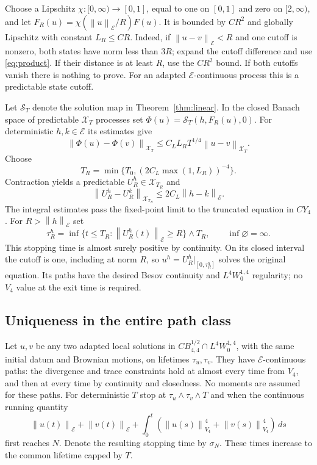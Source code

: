 \documentclass[11pt]{article}
\numberwithin{equation}{section}
\theoremstyle{remark}
\newcommand{\calE}{\mathcal E}
\newcommand{\calX}{\mathcal X}
\newcommand{\norm}[1]{\left\lVert#1\right\rVert}
\begin{document}
Choose a Lipschitz $\chi:[0,\infty)\to[0,1]$, equal to one on
$[0,1]$ and zero on $[2,\infty)$, and let
$F_R(u)=\chi(\norm{u}_{\calE}/R)F(u)$. It is bounded by $CR^2$
and globally Lipschitz with constant $L_R\leq CR$. Indeed, if
$\norm{u-v}_{\calE}<R$ and one cutoff is nonzero, both states have
norm less than $3R$; expand the cutoff difference and use
\eqref{eq:product}. If their distance is at least $R$, use the
$CR^2$ bound. If both cutoffs vanish there is nothing to prove.
For an adapted $\calE$-continuous process this is a predictable
state cutoff.

Let $\mathcal S_T$ denote the solution map in
Theorem~\ref{thm:linear}. In the closed Banach space of predictable
$\calX_T$ processes set $\Phi(u)=\mathcal S_T(h,F_R(u),0)$.
For deterministic $h,k\in\calE$ its estimates give
\[
 \norm{\Phi(u)-\Phi(v)}_{\calX_T}
 \leq C_L L_R T^{1/4}\norm{u-v}_{\calX_T}.
\]
Choose
\begin{equation}\label{eq:T-R}
 T_R=\min\{T_0,(2C_L\max(1,L_R))^{-4}\}.
\end{equation}
Contraction yields a predictable $U_R^h\in\calX_{T_R}$ and
\begin{equation}\label{eq:cutoff-lipschitz}
 \norm{U_R^h-U_R^k}_{\calX_{T_R}}\leq2C_L\norm{h-k}_{\calE}.
\end{equation}
The integral estimates pass the fixed-point limit to the truncated
equation in $CY_4$. For $R>\norm{h}_{\calE}$ set
\[
 \tau_R^h=\inf\{t\leq T_R:\norm{U_R^h(t)}_{\calE}\geq R\}\wedge T_R,
 \qquad \inf\varnothing=\infty.
\]
This stopping time is almost surely positive by continuity. On its
closed interval the cutoff is one, including at norm $R$, so
$u^h=U_R^h|_{[0,\tau_R^h]}$ solves the original equation. Its paths
have the desired Besov continuity and $L^4W^{1,4}_0$ regularity;
no $V_4$ value at the exit time is required.

\subsection{Uniqueness in the entire path class}\label{sec:uniqueness}

Let $u,v$ be any two adapted local solutions in
$CB^{1/2}_{4,4}\cap L^4W^{1,4}_0$, with the same initial datum and
Brownian motions, on lifetimes $\tau_u,\tau_v$. They have
$\calE$-continuous paths: the divergence and trace constraints hold
at almost every time from $V_4$, and then at every time by continuity
and closedness. No moments are assumed for these paths.
For deterministic $T$ stop at $\tau_u\wedge\tau_v\wedge T$ and
when the continuous running quantity
\[
 \norm{u(t)}_{\calE}+\norm{v(t)}_{\calE}
 +\int_0^t(\norm{u(s)}_{V_4}^4+\norm{v(s)}_{V_4}^4)\,ds
\]
first reaches $N$. Denote the resulting stopping time by $\sigma_N$.
These times increase to the common lifetime capped by $T$.
\end{document}
